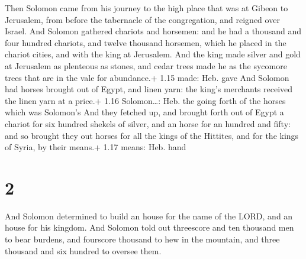  Then Solomon came from his journey to the high place
that was at Gibeon to Jerusalem, from before the tabernacle of the
congregation, and reigned over Israel.  And Solomon
gathered chariots and horsemen: and he had a thousand and four hundred
chariots, and twelve thousand horsemen, which he placed in the chariot
cities, and with the king at Jerusalem.  And the king made
silver and gold at Jerusalem as plenteous as stones, and cedar trees
made he as the sycomore trees that are in the vale for abundance.+ 1.15
made: Heb. gave  And Solomon had horses brought out of
Egypt, and linen yarn: the king's merchants received the linen yarn at a
price.+ 1.16 Solomon\ldots: Heb. the going forth of the horses which was
Solomon's  And they fetched up, and brought forth out of
Egypt a chariot for six hundred shekels of silver, and an horse for an
hundred and fifty: and so brought they out horses for all the kings of
the Hittites, and for the kings of Syria, by their means.+ 1.17 means:
Heb. hand

\hypertarget{section-1}{%
\section{2}\label{section-1}}

 And Solomon determined to build an house for the name of
the LORD, and an house for his kingdom.  And Solomon told
out threescore and ten thousand men to bear burdens, and fourscore
thousand to hew in the mountain, and three thousand and six hundred to
oversee them.

